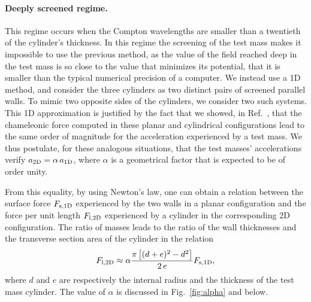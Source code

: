 \documentclass[aps,prd,twocolumn,superscriptaddress,nofootinbib,eqsecnumm,showpacs]{revtex4-1}
\renewcommand\({\left(}
\renewcommand\){\right)}
\renewcommand\[{\left[}
\renewcommand\]{\right]}
\begin{document}
\paragraph{Deeply screened regime.}
This regime occurs when the Compton wavelengths are smaller than a twentieth of the cylinder's thickness. In this regime the screening of the test mass makes it impossible to use the previous method, as the value of the field reached deep in the test mass is so close to the value that minimizes its potential, that it is smaller than the typical numerical precision of a computer. We instead use a 1D method, and consider the three cylinders as two distinct pairs of screened parallel walls. To mimic two opposite sides of the cylinders, we consider two such systems. This 1D approximation is justified by the fact that we showed, in Ref.~\cite{PRD2}, that the chameleonic force computed in these planar and cylindrical configurations lead to the same order of magnitude for the acceleration experienced by a test mass. We thus postulate, for these analogous situations, that the test masses' accelerations verify $a_{\rm 2D} = \alpha \, a_{\rm 1D}$, where $\alpha$ is a geometrical factor that is expected to be of order unity.

From this equality, by using Newton's law, one can obtain a relation between the surface force $F_{\rm s, 1D}$ experienced by the two walls in a planar configuration and the force per unit length $F_{\rm l, 2D}$ experienced by a cylinder in the corresponding 2D configuration. The ratio of masses leads to the ratio of the wall thicknesses and the transverse section area of the cylinder in the relation
\begin{equation}
F_{\rm l, 2D} \approx \alpha \frac{\pi \left[(d+ e)^2 - d^2\right]}{2\, e} F_{\rm s, 1D},
\label{eq:F_equiv}
\end{equation}
where $d$ and $e$ are respectively the internal radius and the thickness of the test mass cylinder. The value of $\alpha$ is discussed in Fig.~\ref{fig:alpha} and below.
\end{document}
